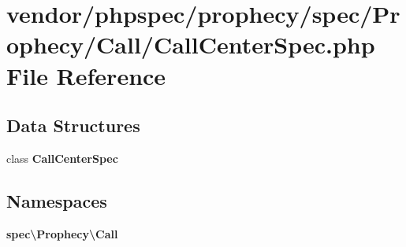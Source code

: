 \section{vendor/phpspec/prophecy/spec/\+Prophecy/\+Call/\+Call\+Center\+Spec.php File Reference}
\label{_call_center_spec_8php}
\subsection*{Data Structures}
\begin{DoxyCompactItemize}
\item 
class {\bf Call\+Center\+Spec}
\end{DoxyCompactItemize}
\subsection*{Namespaces}
\begin{DoxyCompactItemize}
\item 
 {\bf spec\textbackslash{}\+Prophecy\textbackslash{}\+Call}
\end{DoxyCompactItemize}

